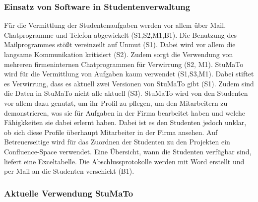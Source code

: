 \documentclass[
  12pt,
  ngerman,
  a4paper,
]{article}
\begin{document}
\hypertarget{einsatz-von-software-in-studentenverwaltung}{%
\subsubsection{Einsatz von Software in
Studentenverwaltung}\label{einsatz-von-software-in-studentenverwaltung}}

Für die Vermittlung der Studentenaufgaben werden vor allem über Mail,
Chatprogramme und Telefon abgewickelt (S1,S2,M1,B1). Die Benutzung des
Mailprogrammes stößt vereinzeilt auf Unmut (S1). Dabei wird vor allem
die langsame Kommunikation kritisiert (S2). Zudem sorgt die Verwendung
von mehreren firmeninternen Chatprogrammen für Verwirrung (S2, M1).
StuMaTo wird für die Vermittlung von Aufgaben kaum verwendet (S1,S3,M1).
Dabei stiftet es Verwirrung, dass es aktuell zwei Versionen von StuMaTo
gibt (S1). Zudem sind die Daten in StuMaTo nicht alle aktuell (S3).
StuMaTo wird von den Studenten vor allem dazu genutzt, um ihr Profil zu
pflegen, um den Mitarbeitern zu demonstrieren, was sie für Aufgaben in
der Firma bearbeitet haben und welche Fähigkkeiten sie dabei erlernt
haben. Dabei ist es den Studenten jedoch unklar, ob sich diese Profile
überhaupt Mitarbeiter in der Firma ansehen. Auf Betreuerseitige wird für
das Zuordnen der Studenten zu den Projekten ein Confluence-Space
verwendet. Eine Übersicht, wann die Studenten verfügbar sind, liefert
eine Exceltabelle. Die Abschlussprotokolle werden mit Word erstellt und
per Mail an die Studenten verschickt (B1).

\hypertarget{aktuelle-verwendung-stumato}{%
\subsubsection{Aktuelle Verwendung
StuMaTo}\label{aktuelle-verwendung-stumato}}
\end{document}
